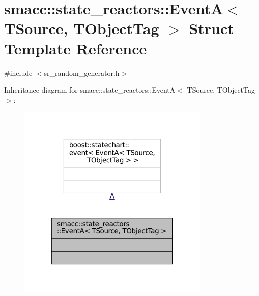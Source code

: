 \hypertarget{structsmacc_1_1state__reactors_1_1EventA}{}\section{smacc\+:\+:state\+\_\+reactors\+:\+:EventA$<$ T\+Source, T\+Object\+Tag $>$ Struct Template Reference}
\label{structsmacc_1_1state__reactors_1_1EventA}


{\ttfamily \#include $<$sr\+\_\+random\+\_\+generator.\+h$>$}



Inheritance diagram for smacc\+:\+:state\+\_\+reactors\+:\+:EventA$<$ T\+Source, T\+Object\+Tag $>$\+:
\nopagebreak
\begin{figure}[H]
\begin{center}
\leavevmode
\includegraphics[width=259pt]{structsmacc_1_1state__reactors_1_1EventA__inherit__graph}
\end{center}
\end{figure}


